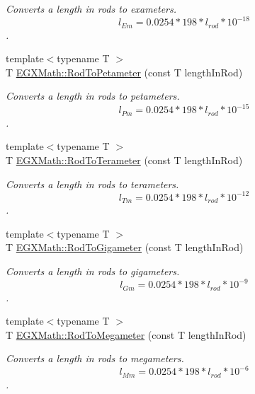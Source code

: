 \begin{DoxyCompactItemize}
\begin{DoxyCompactList}\small\item\em Converts a length in rods to exameters. \[ l_{Em}=0.0254 * 198 * l_{rod} * 10^{-18} \]. \end{DoxyCompactList}\item 
{\footnotesize template$<$typename T $>$ }\\T \mbox{\hyperlink{group___e_g_x_math-_conversions-_length_conversions-_surveyors-_rod-_s_i_ga058c851a5a43a832b21eb2b077683b17}{E\+G\+X\+Math\+::\+Rod\+To\+Petameter}} (const T length\+In\+Rod)
\begin{DoxyCompactList}\small\item\em Converts a length in rods to petameters. \[ l_{Pm}=0.0254 * 198 * l_{rod} * 10^{-15} \]. \end{DoxyCompactList}\item 
{\footnotesize template$<$typename T $>$ }\\T \mbox{\hyperlink{group___e_g_x_math-_conversions-_length_conversions-_surveyors-_rod-_s_i_ga3a9ef9cdcea7b3d53cf5020bce58d117}{E\+G\+X\+Math\+::\+Rod\+To\+Terameter}} (const T length\+In\+Rod)
\begin{DoxyCompactList}\small\item\em Converts a length in rods to terameters. \[ l_{Tm}=0.0254 * 198 * l_{rod} * 10^{-12} \]. \end{DoxyCompactList}\item 
{\footnotesize template$<$typename T $>$ }\\T \mbox{\hyperlink{group___e_g_x_math-_conversions-_length_conversions-_surveyors-_rod-_s_i_ga01d170f936da7b474a5ef3d7b8628d11}{E\+G\+X\+Math\+::\+Rod\+To\+Gigameter}} (const T length\+In\+Rod)
\begin{DoxyCompactList}\small\item\em Converts a length in rods to gigameters. \[ l_{Gm}=0.0254 * 198 * l_{rod} * 10^{-9} \]. \end{DoxyCompactList}\item 
{\footnotesize template$<$typename T $>$ }\\T \mbox{\hyperlink{group___e_g_x_math-_conversions-_length_conversions-_surveyors-_rod-_s_i_ga9d9fb3fa0628bdf3b9fb60f719f8010e}{E\+G\+X\+Math\+::\+Rod\+To\+Megameter}} (const T length\+In\+Rod)
\begin{DoxyCompactList}\small\item\em Converts a length in rods to megameters. \[ l_{Mm}=0.0254 * 198 * l_{rod} * 10^{-6} \]. \end{DoxyCompactList}\item 

\end{DoxyCompactItemize}
